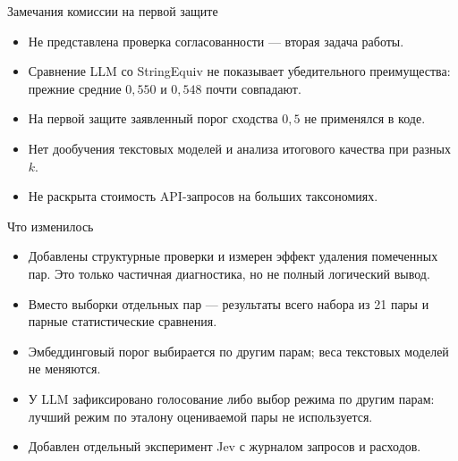 \documentclass[aspectratio=169,11pt]{beamer}
\begin{document}
\appendix
\renewcommand{\hseframenumber}{A\insertframenumber}

\renewcommand{\hseheadertext}{Дополнительные материалы}
\begin{frame}{Замечания комиссии на первой защите}
  \begin{itemize}
    \item Не представлена проверка согласованности — вторая задача работы.
    \item Сравнение LLM со StringEquiv не показывает убедительного преимущества:
      прежние средние $0{,}550$ и $0{,}548$ почти совпадают.
    \item На первой защите заявленный порог сходства $0{,}5$ не применялся в коде.
    \item Нет дообучения текстовых моделей и анализа итогового качества при разных $k$.
    \item Не раскрыта стоимость API-запросов на больших таксономиях.
  \end{itemize}
\end{frame}

\renewcommand{\hseheadertext}{Дополнительные материалы}
\begin{frame}{Что изменилось}
  \begin{itemize}
    \item Добавлены структурные проверки и измерен эффект удаления помеченных пар.
      Это только частичная диагностика, но не полный логический вывод.
    \item Вместо выборки отдельных пар — результаты всего набора из 21 пары
      и парные статистические сравнения.
    \item Эмбеддинговый порог выбирается по другим парам; веса текстовых моделей
      не меняются.
    \item У LLM зафиксировано голосование либо выбор режима по другим парам:
      лучший режим по эталону оцениваемой пары не используется.
    \item Добавлен отдельный эксперимент Jev с журналом запросов и расходов.
  \end{itemize}
\end{frame}
\end{document}
